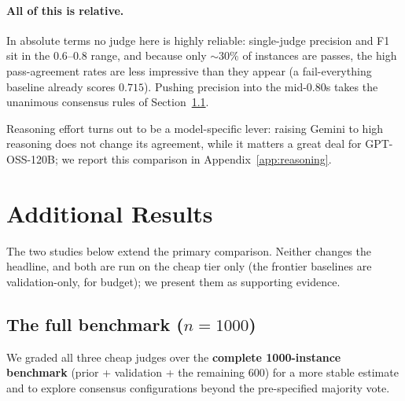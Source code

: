 \documentclass{article}
\begin{document}
\paragraph{All of this is relative.}
In absolute terms no judge here is highly reliable: single-judge precision and F1
sit in the $0.6$--$0.8$ range, and because only ${\sim}30\%$ of instances are
passes, the high pass-agreement rates are less impressive than they appear (a
fail-everything baseline already scores $0.715$). Pushing precision into the
mid-$0.80$s takes the unanimous consensus rules of Section~\ref{sec:full}.

\medskip
Reasoning effort turns out to be a model-specific lever: raising Gemini to high
reasoning does not change its agreement, while it matters a great deal for
GPT-OSS-120B; we report this comparison in Appendix~\ref{app:reasoning}.

\section{Additional Results}
\label{sec:additional}

The two studies below extend the primary comparison. Neither changes the headline,
and both are run on the cheap tier only (the frontier baselines are
validation-only, for budget); we present them as supporting evidence.

\subsection{The full benchmark ($n=1000$)}
\label{sec:full}

We graded all three cheap judges over the \textbf{complete 1000-instance
benchmark} (prior + validation + the remaining 600) for a more stable estimate and
to explore consensus configurations beyond the pre-specified majority vote.
\end{document}
